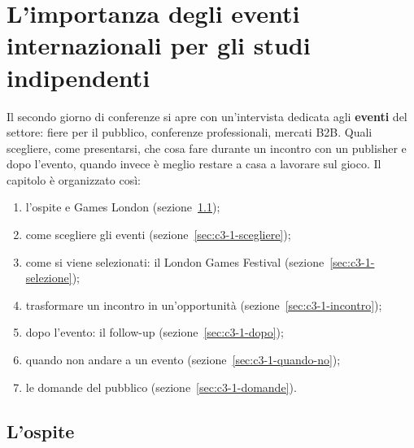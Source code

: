 
\chapter[Eventi internazionali per gli studi indie]{L'importanza degli eventi
internazionali per gli studi indipendenti}
\label{cap:c3-1-eventi-internazionali}

Il secondo giorno di conferenze si apre con un'intervista dedicata agli
\textbf{eventi} del settore: fiere per il pubblico, conferenze professionali,
mercati B2B. Quali scegliere, come presentarsi, che cosa fare durante un incontro
con un publisher e dopo l'evento, quando invece è meglio restare a casa a lavorare
sul gioco. Il capitolo è organizzato così:
\begin{enumerate}
  \item l'ospite e Games London (sezione~\ref{sec:c3-1-ospite});
  \item come scegliere gli eventi (sezione~\ref{sec:c3-1-scegliere});
  \item come si viene selezionati: il London Games Festival
        (sezione~\ref{sec:c3-1-selezione});
  \item trasformare un incontro in un'opportunità
        (sezione~\ref{sec:c3-1-incontro});
  \item dopo l'evento: il follow-up (sezione~\ref{sec:c3-1-dopo});
  \item quando non andare a un evento (sezione~\ref{sec:c3-1-quando-no});
  \item le domande del pubblico (sezione~\ref{sec:c3-1-domande}).
\end{enumerate}

\section{L'ospite}
\label{sec:c3-1-ospite}

